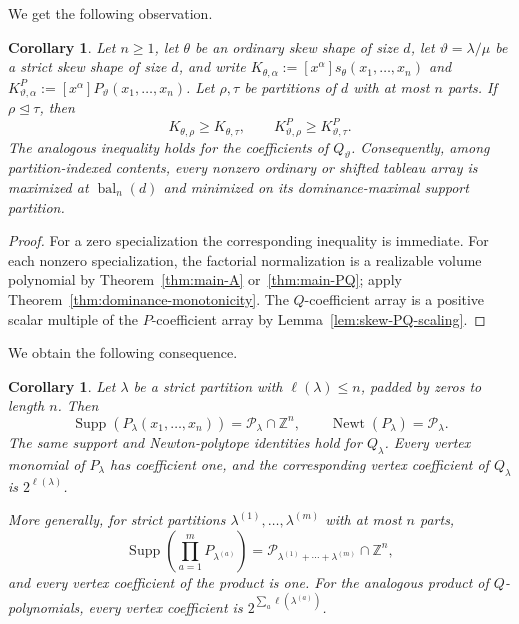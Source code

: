 \documentclass[11pt,a4paper,oneside]{amsart}
\numberwithin{equation}{section}
\newtheorem{corollary}[theorem]{Corollary}
\theoremstyle{definition}
\theoremstyle{remark}
\DeclareMathOperator{\Supp}{Supp}
\DeclareMathOperator{\Newt}{Newt}
\newcommand{\Z}{\mathbb Z}
\begin{document}
We get the following observation.

\begin{corollary}\label{cor:tableau-dominance}
Let $n\geq1$, let $\theta$ be an ordinary skew shape of size $d$, let
$\vartheta=\lambda/\mu$ be a strict skew shape of size $d$, and write
$K_{\theta,\alpha}:=[x^\alpha]s_\theta(x_1,\ldots,x_n)$ and
$K^P_{\vartheta,\alpha}:=[x^\alpha]P_\vartheta(x_1,\ldots,x_n)$.  Let
$\rho,\tau$ be partitions of $d$ with at most $n$ parts.  If
$\rho\unlhd\tau$, then
\[
 K_{\theta,\rho}\geq K_{\theta,\tau},
 \qquad
 K^P_{\vartheta,\rho}\geq K^P_{\vartheta,\tau}.
\]
The analogous inequality holds for the coefficients of $Q_\vartheta$.
Consequently, among partition-indexed contents, every nonzero ordinary or
shifted tableau array is maximized at $\operatorname{bal}_n(d)$ and minimized
on its dominance-maximal support partition.
\end{corollary}

\begin{proof}
For a zero specialization the corresponding inequality is immediate.  For
each nonzero specialization, the factorial normalization is a realizable
volume polynomial by Theorem~\ref{thm:main-A} or~\ref{thm:main-PQ}; apply
Theorem~\ref{thm:dominance-monotonicity}.  The $Q$-coefficient array is a
positive scalar multiple of the $P$-coefficient array by
Lemma~\ref{lem:skew-PQ-scaling}.
\end{proof}

We obtain the following consequence.

\begin{corollary}\label{cor:straight-P-support}
Let $\lambda$ be a strict partition with $\ell(\lambda)\leq n$, padded by zeros to length $n$.  Then
\begin{equation}\label{eq:straight-P-support}
 \Supp(P_\lambda(x_1,\ldots,x_n))
 =\mathcal P_\lambda\cap\Z^n,
 \qquad
 \Newt(P_\lambda)=\mathcal P_\lambda.
\end{equation}
The same support and Newton-polytope identities hold for $Q_\lambda$.  Every vertex monomial of $P_\lambda$ has coefficient one, and the corresponding vertex coefficient of $Q_\lambda$ is $2^{\ell(\lambda)}$.

More generally, for strict partitions $\lambda^{(1)},\ldots,\lambda^{(m)}$ with at most $n$ parts,
\begin{equation}\label{eq:straight-P-product-support}
 \Supp\left(\prod_{a=1}^mP_{\lambda^{(a)}}\right)
 =\mathcal P_{\lambda^{(1)}+\cdots+\lambda^{(m)}}\cap\Z^n,
\end{equation}
and every vertex coefficient of the product is one.  For the analogous product of $Q$-polynomials, every vertex coefficient is
$2^{\sum_a\ell(\lambda^{(a)})}$.
\end{corollary}
\end{document}
